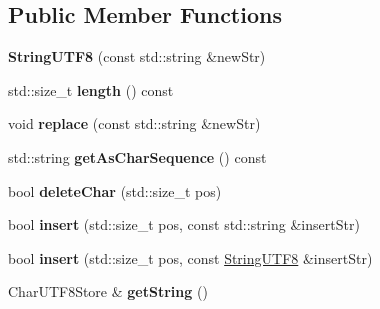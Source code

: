 \subsection*{Public Member Functions}
\begin{DoxyCompactItemize}
\item 
\mbox{\label{classStringUtils_1_1StringUTF8_a90576289db106ae31a8cde6270616557}} 
{\bfseries String\+U\+T\+F8} (const std\+::string \&new\+Str)
\item 
\mbox{\label{classStringUtils_1_1StringUTF8_a6f80c06b04e4954beafcd93e1f817b43}} 
std\+::size\+\_\+t {\bfseries length} () const
\item 
\mbox{\label{classStringUtils_1_1StringUTF8_aa22f0f8d7851e83f3fe742b08829b0fd}} 
void {\bfseries replace} (const std\+::string \&new\+Str)
\item 
\mbox{\label{classStringUtils_1_1StringUTF8_a95e853e98fd631a912c2364ecb97e94d}} 
std\+::string {\bfseries get\+As\+Char\+Sequence} () const
\item 
\mbox{\label{classStringUtils_1_1StringUTF8_a7bc7fa3962cfbe4bfe08f1ab5f3a521e}} 
bool {\bfseries delete\+Char} (std\+::size\+\_\+t pos)
\item 
\mbox{\label{classStringUtils_1_1StringUTF8_a6d0ff54dc1dc23df844252b175bfdc9f}} 
bool {\bfseries insert} (std\+::size\+\_\+t pos, const std\+::string \&insert\+Str)
\item 
\mbox{\label{classStringUtils_1_1StringUTF8_a2e09405cd941e199eba8743cdb6dd8eb}} 
bool {\bfseries insert} (std\+::size\+\_\+t pos, const \hyperlink{classStringUtils_1_1StringUTF8}{String\+U\+T\+F8} \&insert\+Str)
\item 
\mbox{\label{classStringUtils_1_1StringUTF8_ad05127c1730bac29164785c476d9ef96}} 
Char\+U\+T\+F8\+Store \& {\bfseries get\+String} ()
\item 
\mbox{\label{classStringUtils_1_1StringUTF8_a90576289db106ae31a8cde6270616557}} 

\end{DoxyCompactItemize}
